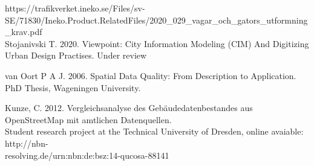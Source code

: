 \documentclass[a4paper]{article}
\begin{document}
\begin{thebibliography}{9}
https://trafikverket.ineko.se/Files/sv-SE/71830/Ineko.Product.RelatedFiles/2020\_029\_vagar\_och\_gators\_utformning\_krav.pdf \\

Stojanivski T. 2020. Viewpoint: City Information Modeling (CIM) And Digitizing Urban Design Practises.
Under review

van Oort P A J. 2006. Spatial Data Quality: From Description to Application. PhD Thesis, Wageningen University.

Kunze, C. 2012. Vergleichsanalyse des Gebäudedatenbestandes aus OpenStreetMap mit amtlichen Datenquellen. \\
Student research project at the Technical University of Dresden, online avaiable: http://nbn- \\
resolving.de/urn:nbn:de:bsz:14-qucosa-88141

\end{thebibliography}
\end{document}
